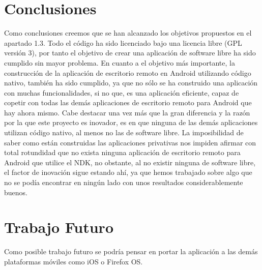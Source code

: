 \section{Conclusiones}
Como conclusiones creemos que se han alcanzado los objetivos propuestos en el apartado 1.3. Todo el código ha sido licenciado bajo una licencia libre (GPL versión 3), por tanto el objetivo de crear una aplicación de software libre ha sido cumplido sin mayor problema. En cuanto a el objetivo más importante, la construcción de la aplicación de escritorio remoto en Android utilizando código nativo, también ha sido cumplido, ya que no sólo se ha construido una aplicación con muchas funcionalidades, si no que, es una aplicación eficiente, capaz de copetir con todas las demás aplicaciones de escritorio remoto para Android que hay ahora mismo. Cabe destacar una vez más que la gran diferencia y la razón por la que este proyecto es inovador, es en que ninguna de las demás aplicaciones utilizan código nativo, al menos no las de software libre. La imposibilidad de saber como están construidas las aplicaciones privativas nos impiden afirmar con total rotundidad que no exista ninguna aplicación de escritorio remoto para Android que utilice el NDK, no obstante, al no existir ninguna de software libre, el factor de inovación sigue estando ahí, ya que hemos trabajado sobre algo que no se podía encontrar en ningún lado con unos resultados considerablemente buenos.

\section{Trabajo Futuro}

Como posible trabajo futuro se podría pensar en portar la aplicación a las demás plataformas móviles como iOS o Firefox OS.
